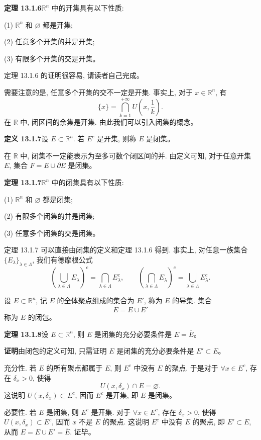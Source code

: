 \documentclass[UTF8,12pt,a4paper,fontset=fandol]{ctexart}
\begin{document}
\noindent\textbf{定理 13.1.6}\quad $\mathbb R^n$ 中的开集具有以下性质:

(1) $\mathbb R^n$ 和 $\varnothing$ 都是开集;

(2) 任意多个开集的并是开集;

(3) 有限多个开集的交是开集。

定理 13.1.6 的证明很容易, 请读者自己完成。

需要注意的是, 任意多个开集的交不一定是开集. 事实上, 对于 $x\in\mathbb R^n$, 有
\[
  \{x\}=\bigcap_{k=1}^{+\infty}U\left(x,\frac1k\right).
\]
在 $\mathbb R$ 中, 闭区间的余集是开集. 由此我们可以引入闭集的概念。

\noindent\textbf{定义 13.1.7}\quad 设 $E\subset\mathbb R^n$. 若 $E^c$ 是开集, 则称 $E$ 是闭集。

在 $\mathbb R$ 中, 闭集不一定能表示为至多可数个闭区间的并. 由定义可知, 对于任意开集 $E$, 集合 $F=E\cup\partial E$ 是闭集。

\noindent\textbf{定理 13.1.7}\quad $\mathbb R^n$ 中的闭集具有以下性质:

(1) $\mathbb R^n$ 和 $\varnothing$ 都是闭集;

(2) 有限多个闭集的并是闭集;

(3) 任意多个闭集的交是闭集。

定理 13.1.7 可以直接由闭集的定义和定理 13.1.6 得到. 事实上, 对任意一族集合 $\{E_\lambda\}_{\lambda\in\Lambda}$, 我们有德摩根公式
\[
  \left(\bigcup_{\lambda\in\Lambda}E_\lambda\right)^c
  =\bigcap_{\lambda\in\Lambda}E_\lambda^c,\qquad
  \left(\bigcap_{\lambda\in\Lambda}E_\lambda\right)^c
  =\bigcup_{\lambda\in\Lambda}E_\lambda^c.
\]

设 $E\subset\mathbb R^n$, 记 $E$ 的全体聚点组成的集合为 $E'$, 称为 $E$ 的导集. 集合
\[
  \overline E=E\cup E'
\]
称为 $E$ 的闭包。

\noindent\textbf{定理 13.1.8}\quad 设 $E\subset\mathbb R^n$, 则 $E$ 是闭集的充分必要条件是 $E=\overline E$。

\noindent\textbf{证明}\quad 由闭包的定义可知, 只需证明 $E$ 是闭集的充分必要条件是 $E'\subset E$。

充分性. 若 $E$ 的所有聚点都属于 $E$, 则 $E^c$ 中没有 $E$ 的聚点. 于是对于 $\forall x\in E^c$, 存在 $\delta_x>0$, 使得
\[
  U(x,\delta_x)\cap E=\varnothing.
\]
这说明 $U(x,\delta_x)\subset E^c$, 因而 $E^c$ 是开集, 即 $E$ 是闭集。

必要性. 若 $E$ 是闭集, 则 $E^c$ 是开集. 对于 $\forall x\in E^c$, 存在 $\delta_x>0$, 使得 $U(x,\delta_x)\subset E^c$, 因而 $x$ 不是 $E$ 的聚点. 这说明 $E^c$ 中没有 $E$ 的聚点, 即 $E'\subset E$, 从而 $E=E\cup E'=\overline E$. 证毕。
\end{document}
